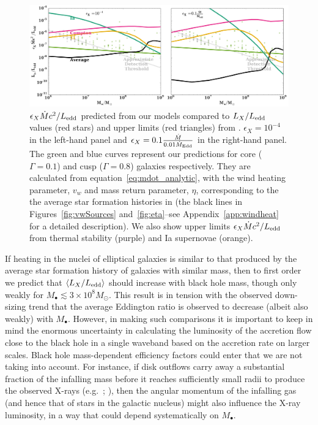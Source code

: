 \documentclass[usenatbib,fleqn]{mn2e}
\newcommand{\Mdot}{\dot{M}}
\newcommand{\MdotEdd}{\dot{M}_{\rm Edd}}
\begin{document}
\begin{figure}
\includegraphics[width=\textwidth]{miller.pdf}
\caption{\label{fig:miller} $\epsilon_X \Mdot c^2/L_{\rm edd}$ predicted
  from our models compared to $L_X/L_{\rm edd}$ values (red stars) and
  upper limits (red triangles) from \citet{Miller+15}.
  $\epsilon_X=10^{-4}$ in the left-hand panel and $\epsilon_X=0.1
  \frac{\Mdot}{0.01 \MdotEdd}$ in the right-hand panel. The green and
  blue curves represent our predictions for core ($\Gamma=0.1$)
  and cusp ($\Gamma=0.8$) galaxies respectively. They are calculated
  from equation~\eqref{eq:mdot_analytic}, with the wind heating
  parameter, $v_w$ and mass return parameter, $\eta$, corresponding to
  the the average star formation histories in
  \citet{MosterNaab+:2013a} (the black lines in
  Figures~\ref{fig:vwSources} and~\ref{fig:eta}--see
  Appendix~\ref{app:windheat} for a detailed description).
  We also show upper limits $\epsilon_X \Mdot c^2/L_{\rm edd}$ from
  thermal stability (purple) and Ia supernovae (orange).}
\end{figure}

If heating in the nuclei of elliptical galaxies is similar to that produced by the average star formation history of galaxies with similar mass, then to first order we predict that $\langle L_{X}/L_{\rm edd}\rangle$ should increase with black hole mass, though only weakly for $M_{\bullet} \lesssim 3\times 10^{8}M_{\odot}$.  This result is in tension with the observed down-sizing trend that the average Eddington ratio is observed to decrease (albeit also weakly) with $M_{\bullet}$.  However, in making such comparisons it is important to keep in mind the enormous uncertainty in calculating the luminosity of the accretion flow close to the black hole in a single waveband based on the accretion rate on larger scales.  Black hole mass-dependent efficiency factors could enter that we are not taking into account.  For instance, if disk outflows carry away a substantial fraction of the infalling mass before it reaches sufficiently small radii to produce the observed X-rays (e.g.~\citealt{Blandford&Begelman99}; \citealt{Li+13}), then the angular momentum of the infalling gas (and hence that of stars in the galactic nucleus) might also influence the X-ray luminosity, in a way that could depend systematically on $M_{\bullet}$.
\end{document}
